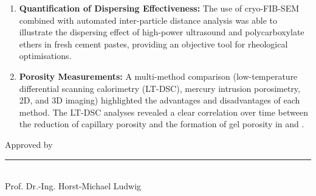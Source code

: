 \documentclass[11pt, a4paper]{article}
\begin{document}
\begin{enumerate}[label=\textbf{\arabic*.}, leftmargin=1.5cm, labelsep=0.5cm, itemsep=0.5em, resume]
    \item \textbf{Quantification of Dispersing Effectiveness:} The use of cryo-FIB-SEM combined with automated inter-particle distance analysis was able to illustrate the dispersing effect of high-power ultrasound and polycarboxylate ethers in fresh cement pastes, providing an objective tool for rheological optimisations.
    \item \textbf{Porosity Measurements:} A multi-method comparison (low-temperature differential scanning calorimetry (LT-DSC), mercury intrusion porosimetry, 2D, and 3D imaging) highlighted the advantages and disadvantages of each method. The LT-DSC analyses revealed a clear correlation over time between the reduction of capillary porosity and the formation of gel porosity in  and .
\end{enumerate}

\vfill

\noindent Approved by

\vspace{2cm}
\noindent\rule{7cm}{0.4pt}\\
Prof. Dr.-Ing. Horst-Michael Ludwig
\end{document}
